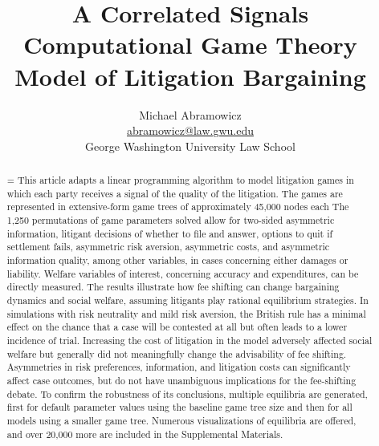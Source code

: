 \documentclass{article}
\newenvironment{nohyphen}
  {\tolerance=1%
   \emergencystretch=\maxdimen%
   \hyphenpenalty=10000%
   \hbadness=10000}%
  {\par}%
\begin{document}
\title{A Correlated Signals \\ Computational Game Theory \\ Model of Litigation Bargaining}
\author{Michael Abramowicz \\ \href{mailto:abramowicz@law.gwu.edu}{abramowicz@law.gwu.edu} \\ George Washington University Law School}

\maketitle

\begin{abstract}
\begin{nohyphen}
This article adapts a linear programming algorithm to model litigation games in which each party receives a signal of the quality of the litigation. The games are represented in extensive-form game trees of approximately 45,000 nodes each The 1,250 permutations of game parameters solved allow for two-sided asymmetric information, litigant decisions of whether to file and answer, options to quit if settlement fails, asymmetric risk aversion, asymmetric costs, and asymmetric information quality, among other variables, in cases concerning either damages or liability. Welfare variables of interest, concerning accuracy and expenditures, can be directly measured. The results illustrate how fee shifting can change bargaining dynamics and social welfare, assuming litigants play rational equilibrium strategies. In simulations with risk neutrality and mild risk aversion, the British rule has a minimal effect on the chance that a case will be contested at all but often leads to a lower incidence of trial. Increasing the cost of litigation in the model adversely affected social welfare but generally did not meaningfully change the advisability of fee shifting. Asymmetries in risk preferences, information, and litigation costs can significantly affect case outcomes, but do not have unambiguous implications for the fee-shifting debate. To confirm the robustness of its conclusions, multiple equilibria are generated, first for default parameter values using the baseline game tree size and then for all models using a smaller game tree. Numerous visualizations of equilibria are offered, and over 20,000 more are included in the Supplemental Materials. 
\end{nohyphen}
\end{abstract}
\end{document}
